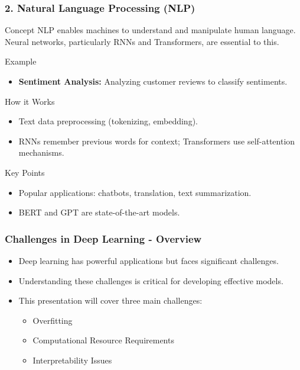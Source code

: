 \documentclass[aspectratio=169]{beamer}
\begin{document}
\begin{frame}[fragile]
    \frametitle{2. Natural Language Processing (NLP)}
    
    \begin{block}{Concept}
        NLP enables machines to understand and manipulate human language. Neural networks, particularly RNNs and Transformers, are essential to this.
    \end{block}

    \begin{exampleblock}{Example}
        \begin{itemize}
            \item \textbf{Sentiment Analysis:} Analyzing customer reviews to classify sentiments.
        \end{itemize}
    \end{exampleblock}
    
    \begin{block}{How it Works}
        \begin{itemize}
            \item Text data preprocessing (tokenizing, embedding).
            \item RNNs remember previous words for context; Transformers use self-attention mechanisms.
        \end{itemize}
    \end{block}

    \begin{block}{Key Points}
        \begin{itemize}
            \item Popular applications: chatbots, translation, text summarization.
            \item BERT and GPT are state-of-the-art models.
        \end{itemize}
    \end{block}
    
\end{frame}

\begin{frame}[fragile]
    \frametitle{Challenges in Deep Learning - Overview}
    \begin{itemize}
        \item Deep learning has powerful applications but faces significant challenges.
        \item Understanding these challenges is critical for developing effective models.
        \item This presentation will cover three main challenges:
            \begin{itemize}
                \item Overfitting
                \item Computational Resource Requirements
                \item Interpretability Issues
            \end{itemize}
    \end{itemize}
\end{frame}
\end{document}
